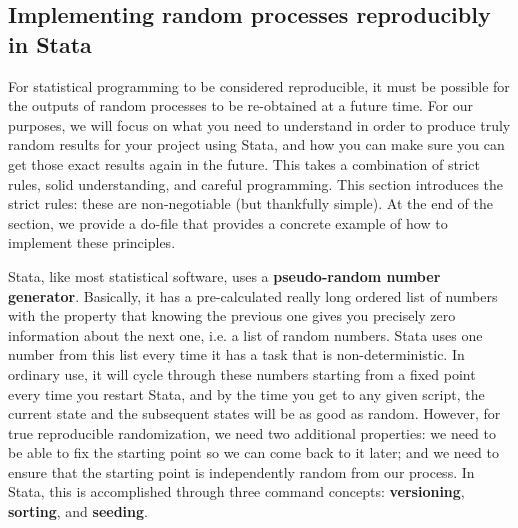 \subsection{Implementing random processes reproducibly in Stata}

For statistical programming to be considered reproducible, it must be possible for the outputs of random processes
to be re-obtained at a future time.\cite{orozco2018make}
For our purposes, we will focus on what you need to understand
in order to produce truly random results for your project using Stata,
and how you can make sure you can get those exact results again in the future.
This takes a combination of strict rules, solid understanding, and careful programming.
This section introduces the strict rules: these are non-negotiable (but thankfully simple). 
At the end of the section, 
we provide a do-file that provides a concrete example of how to implement these principles. 

Stata, like most statistical software, uses a \textbf{pseudo-random number generator}.
Basically, it has a pre-calculated really long ordered list of numbers with the property that
knowing the previous one gives you precisely zero information about the next one, i.e. a list of random numbers.
Stata uses one number from this list every time it has a task that is non-deterministic.
In ordinary use, it will cycle through these numbers starting from a fixed point
every time you restart Stata, and by the time you get to any given script,
the current state and the subsequent states will be as good as random.
However, for true reproducible randomization, we need two additional properties:
we need to be able to fix the starting point so we can come back to it later;
and we need to ensure that the starting point is independently random from our process.
In Stata, this is accomplished through three command concepts:
\textbf{versioning}, \textbf{sorting}, and \textbf{seeding}.

